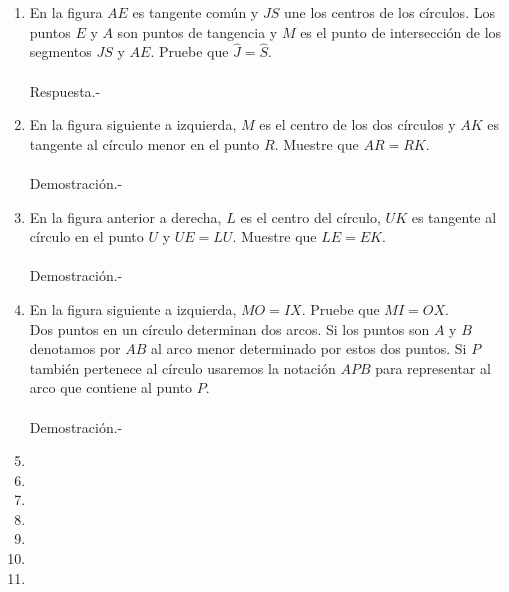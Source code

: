 \documentclass[10pt]{article}
\begin{document}
\begin{enumerate}
\begin{enumerate}[\bfseries a)]
    \end{enumerate}


\item En la figura $AE$ es tangente común y $JS$ une los centros de los círculos. Los puntos $E$ y $A$ son puntos de tangencia y $M$ es el punto de intersección de los segmentos $JS$ y $AE$. Pruebe que $\widehat{J} = \widehat{S}.$\\\\
    Respuesta.-\; 

\item En la figura siguiente a izquierda, $M$ es el centro de los dos círculos y $AK$ es tangente al círculo menor en el punto $R$. Muestre que $AR = RK$.\\\\
    Demostración.-\;

\item En la figura anterior a derecha, $L$ es el centro del círculo, $UK$ es tangente al círculo en el punto $U$ y $UE = LU$. Muestre que $LE = EK.$\\\\
    Demostración.-\;

\item En la figura siguiente a izquierda, $MO = IX$. Pruebe que $MI = OX$.\\
Dos puntos en un círculo determinan dos arcos. Si los puntos son $A$ y $B$ denotamos por $AB$ al arco menor determinado por estos dos puntos. Si $P$ también pertenece al círculo usaremos la notación $APB$ para representar al arco que contiene al punto $P$.\\\\
    Demostración.-\;

\item 

\item 

\item 

\item 

\item 

\item 

\item 


\end{enumerate}
\end{document}
